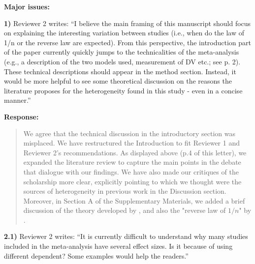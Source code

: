 \documentclass[a4paper,12pt]{article}
\begin{document}
\textbf{Major issues:}

\noindent \textbf{1)} Reviewer 2 writes: ``I believe the main framing of this manuscript should focus on explaining the interesting variation between studies (i.e., when do the law of 1/n or the reverse law are expected). From this perspective, the introduction part of the paper currently quickly jumps to the technicalities of the meta-analysis (e.g., a description of the two models used, measurement of DV etc.; see p. 2). These technical descriptions should appear in the method section. Instead, it would be more helpful to see some theoretical discussion on the reasons the literature proposes for the heterogeneity found in this study - even in a concise manner.''

\vspace{.3cm}

\noindent \textbf{Response:} 
\begin{quote}
    We agree that the technical discussion in the introductory section was misplaced. We have restructured the Introduction to fit Reviewer 1 and Reviewer 2's recommendations. As displayed above (p.4 of this letter), we expanded the literature review to capture the main points in the debate that dialogue with our findings. We have also made our critiques of the scholarship more clear, explicitly pointing to which we thought were the sources of heterogeneity in previous work in the Discussion section. Moreover, in Section A of the Supplementary Materials, we added a brief discussion of the theory developed by \citet{weingast1981political}, and also the "reverse law of $1/n$" by \citet{primo2008distributive}. 
\end{quote}

\vspace{.3cm}

\noindent \textbf{2.1)} Reviewer 2 writes: ``It is currently difficult to understand why many studies included in the meta-analysis have several effect sizes. Is it because of using different dependent? Some examples would help the readers.''

\vspace{.3cm}
\end{document}
